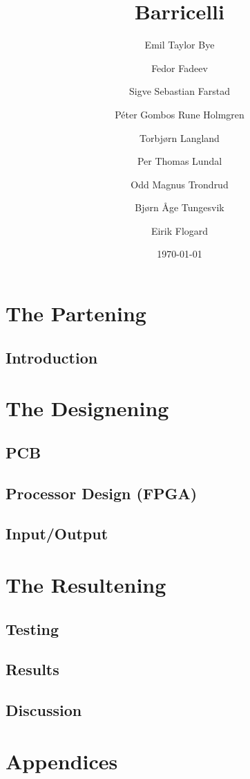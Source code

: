 \documentclass{report}
\title{Barricelli}
\date{\today}
\author{Emil Taylor Bye
     \and Fedor Fadeev
     \and Sigve Sebastian Farstad
     \and Péter Gombos Rune Holmgren
     \and Torbjørn Langland
     \and Per Thomas Lundal
     \and Odd Magnus Trondrud
     \and Bjørn Åge Tungesvik
     \and Eirik Flogard
}
\begin{document}
\maketitle

\begin{abstract}
	
\end{abstract}

\tableofcontents

\part{The Partening}

\chapter{Introduction}
	


\part{The Designening}

\chapter{PCB}
	

\chapter{Processor Design (FPGA)}
	

\chapter{Input/Output}
	

\part{The Resultening}

\chapter{Testing}
	

\chapter{Results}
	

\chapter{Discussion}
	

\part{Appendices}
	



\nocite{*}
\end{document}
